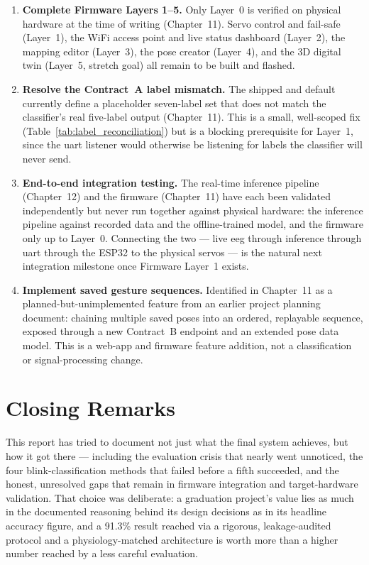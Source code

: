 \begin{enumerate}[leftmargin=*]
    \item \textbf{Complete Firmware Layers 1--5.} Only Layer~0 is
    verified on physical hardware at the time of writing
    (Chapter~11). Servo control and fail-safe (Layer~1), the WiFi
    access point and live status dashboard (Layer~2), the mapping
    editor (Layer~3), the pose creator (Layer~4), and the 3D digital
    twin (Layer~5, stretch goal) all remain to be built and flashed.
    \item \textbf{Resolve the Contract~A label mismatch.} The
    shipped  and default 
    currently define a placeholder seven-label set that does not
    match the classifier's real five-label output (Chapter~11). This
    is a small, well-scoped fix (Table~\ref{tab:label_reconciliation})
    but is a blocking prerequisite for Layer~1, since the
    \acrshort{uart} listener would otherwise be listening for labels
    the classifier will never send.
    \item \textbf{End-to-end integration testing.} The real-time
    inference pipeline (Chapter~12) and the firmware
    (Chapter~11) have each been validated independently but never
    run together against physical hardware: the inference pipeline
    against recorded data and the offline-trained model, and the
    firmware only up to Layer~0. Connecting the two --- live
    \acrshort{eeg} through inference through \acrshort{uart} through
    the ESP32 to the physical servos --- is the natural next
    integration milestone once Firmware Layer~1 exists.
    \item \textbf{Implement saved gesture sequences.} Identified in
    Chapter~11 as a planned-but-unimplemented feature from an
    earlier project planning document: chaining multiple saved poses
    into an ordered, replayable sequence, exposed through a new
    Contract~B endpoint and an extended pose data model. This is a
    web-app and firmware feature addition, not a classification or
    signal-processing change.
\end{enumerate}

\section{Closing Remarks}
\label{sec:conc_remarks}

This report has tried to document not just what the final system
achieves, but how it got there --- including the evaluation crisis
that nearly went unnoticed, the four blink-classification methods
that failed before a fifth succeeded, and the honest, unresolved
gaps that remain in firmware integration and target-hardware
validation. That choice was deliberate: a graduation project's value
lies as much in the documented reasoning behind its design decisions
as in its headline accuracy figure, and a 91.3\% result reached via
a rigorous, leakage-audited protocol and a physiology-matched
architecture is worth more than a higher number reached by a less
careful evaluation.

